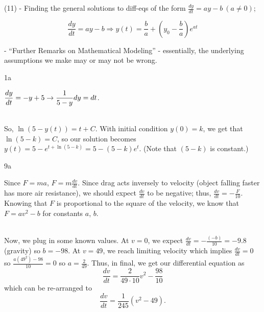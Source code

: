 \documentclass[../../diff_eqs.tex]{subfiles}
\begin{document}



%


(11) - Finding the general solutions to diff-eqs of the form $\frac{dy}{dt} = ay - b \ (a \not = 0)$;

$$\frac{dy}{dt} = ay - b \Longrightarrow y(t) = \frac{b}{a} + \left(y_0 - \frac{b}{a}\right)e^{at}$$

 - ``Further Remarks on Mathematical Modeling'' - essentially, the underlying assumptions we make may or may not be wrong. \textrangle

\hr

\begin{exercise}{1a}

    $\mathlarger{\frac{dy}{dt} = -y + 5 \rightarrow \frac{1}{5 - y} dy = dt}$.

    \phantom \\ 

    So, $\ln(5 - y(t)) = t + C$. With initial condition $y(0) = k$, we get that $\ln(5 - k) = C$, so our solution becomes $y(t) = 5 - e^{t + \ln(5 - k)} = 5 - (5 - k)e^t$. (Note that $(5 - k)$ is constant.)
\end{exercise}


\begin{exercise}{9a}
    
    Since $F = ma$, $F = m\frac{dv}{dt}$. Since drag acts inversely to velocity (object falling faster has more air resistance), we should expect $\frac{dv}{dt}$ to be negative; thus, $\frac{dv}{dt} = -\frac{F}{10}$. Knowing that $F$ is proportional to the square of the velocity, we know that $F = av^2 - b$ for constants $a$, $b$. 

    \phantom \\ 

    Now, we plug in some known values. At $v = 0$, we expect $\frac{dv}{dt} = -\frac{(-b)}{10} = -9.8$ (gravity) so $b = -98$. At $v = 49$, we reach limiting velocity which implies $\frac{dv}{dt} = 0$ so $\frac{a(49^2) - 98}{10} = 0$ so $a = \frac{2}{49}$. Thus, in final, we get our differential equation as $$\frac{dv}{dt} = \frac{2}{49 \cdot 10}v^2 - \frac{98}{10}$$ which can be re-arranged to $$\frac{dv}{dt} = \frac{1}{245}\left(v^2 - 49\right)\text{.}$$
\end{exercise}
\end{document}

